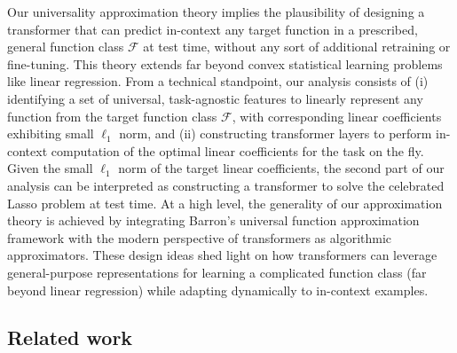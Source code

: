 \documentclass[english]{article}
\begin{document}
Our universality approximation theory implies the plausibility of designing a transformer that can predict in-context any target function in a prescribed, general function class $\mathcal{F}$ at test time,  without any sort of additional retraining or fine-tuning. This theory extends far beyond convex statistical learning problems like linear regression. 
From a technical standpoint, our analysis consists of (i) identifying a set of universal, task-agnostic features to linearly represent any function from the target function class $\mathcal{F}$, with corresponding linear coefficients exhibiting small $\ell_1$ norm, and (ii) constructing transformer layers  to perform in-context computation of the optimal linear coefficients for the task on the fly. Given the small $\ell_1$ norm of the target linear coefficients, the second part of our analysis can be interpreted as constructing a transformer to solve the celebrated Lasso problem at test time.  At a high level, the generality of our approximation theory is achieved by integrating Barron's universal function approximation framework with the modern perspective of transformers as algorithmic approximators.  
These design ideas shed light on how transformers can leverage general-purpose representations for learning a complicated function class (far beyond linear regression) while adapting
dynamically to in-context examples.    








\subsection{Related work} 
\end{document}

